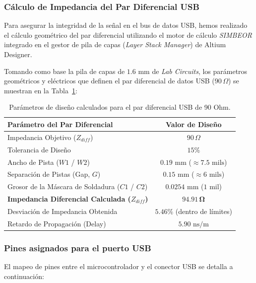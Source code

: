 \documentclass[12pt,a4paper]{article}
\begin{document}
\subsubsection{Cálculo de Impedancia del Par Diferencial USB}

Para asegurar la integridad de la señal en el bus de datos USB, hemos realizado el cálculo geométrico del par diferencial utilizando el motor de cálculo \textit{SIMBEOR} integrado en el gestor de pila de capas (\textit{Layer Stack Manager}) de Altium Designer. 

Tomando como base la pila de capas de $1.6\text{ mm}$ de \textit{Lab Circuits}, los parámetros geométricos y eléctricos que definen el par diferencial de datos USB ($90\,\Omega$) se muestran en la Tabla~\ref{tab:usb_diffpair_params}:

\begin{table}[H]
\centering
\small
\begin{tabular}{|l|c|}
\hline
\textbf{Parámetro del Par Diferencial} & \textbf{Valor de Diseño} \\ \hline
Impedancia Objetivo ($Z_{diff}$) & $90\,\Omega$ \\ \hline
Tolerancia de Diseño & $15$\% \\ \hline
Ancho de Pista ($W1$ / $W2$) & $0.19\text{ mm}$ ($\approx 7.5\text{ mils}$) \\ \hline
Separación de Pistas (Gap, $G$) & $0.15\text{ mm}$ ($\approx 6\text{ mils}$) \\ \hline
Grosor de la Máscara de Soldadura ($C1$ / $C2$) & $0.0254\text{ mm}$ ($1\text{ mil}$) \\ \hline
\textbf{Impedancia Diferencial Calculada ($Z_{diff}$)} & $\mathbf{94.91\,\Omega}$ \\ \hline
Desviación de Impedancia Obtenida & $5.46$\% (dentro de límites) \\ \hline
Retardo de Propagación (Delay) & $5.90\text{ ns/m}$ \\ \hline
\end{tabular}
\caption{Parámetros de diseño calculados para el par diferencial USB de 90 Ohm.}
\label{tab:usb_diffpair_params}
\end{table}

\subsubsection{Pines asignados para el puerto USB}

El mapeo de pines entre el microcontrolador y el conector USB se detalla a continuación:
\end{document}
